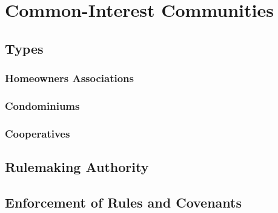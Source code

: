 \chapter{Common-Interest Communities}





\section{Types}

\subsection{Homeowners Associations}




\subsection{Condominiums}




\subsection{Cooperatives}





\section{Rulemaking Authority}





\begin{questions}

\end{questions}






\begin{questions}

\end{questions}

\section{Enforcement of Rules and Covenants}







\begin{questions}

\end{questions}
